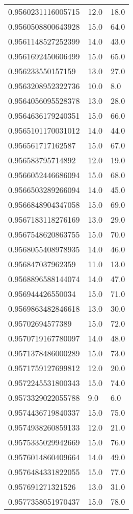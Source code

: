 \begin{center}
\begin{supertabular}[H]{p{0.30\textwidth}p{0.05\textwidth}p{0.05\textwidth}}
0.9560231116005715 & 12.0 & 18.0 \\ 
0.9560508800643928 & 15.0 & 64.0 \\ 
0.9561148527252399 & 14.0 & 43.0 \\ 
0.9561692450606499 & 15.0 & 65.0 \\ 
0.956233550157159 & 13.0 & 27.0 \\ 
0.9563208952322736 & 10.0 & 8.0 \\ 
0.9564056095528378 & 13.0 & 28.0 \\ 
0.9564636179240351 & 15.0 & 66.0 \\ 
0.9565101170031012 & 14.0 & 44.0 \\ 
0.956561717162587 & 15.0 & 67.0 \\ 
0.956583795714892 & 12.0 & 19.0 \\ 
0.9566052446686094 & 15.0 & 68.0 \\ 
0.9566503289266094 & 14.0 & 45.0 \\ 
0.9566848904347058 & 15.0 & 69.0 \\ 
0.9567183118276169 & 13.0 & 29.0 \\ 
0.9567548620863755 & 15.0 & 70.0 \\ 
0.9568055408978935 & 14.0 & 46.0 \\ 
0.956847037962359 & 11.0 & 13.0 \\ 
0.9568896588144074 & 14.0 & 47.0 \\ 
0.956944426550034 & 15.0 & 71.0 \\ 
0.9569863482846618 & 13.0 & 30.0 \\ 
0.95702694577389 & 15.0 & 72.0 \\ 
0.9570719167780097 & 14.0 & 48.0 \\ 
0.9571378486000289 & 15.0 & 73.0 \\ 
0.9571759127699812 & 12.0 & 20.0 \\ 
0.9572245531800343 & 15.0 & 74.0 \\ 
0.9573329022055788 & 9.0 & 6.0 \\ 
0.9574436719840337 & 15.0 & 75.0 \\ 
0.9574938260859133 & 12.0 & 21.0 \\ 
0.9575335029942669 & 15.0 & 76.0 \\ 
0.9576014860409664 & 14.0 & 49.0 \\ 
0.9576484331822055 & 15.0 & 77.0 \\ 
0.957691271321526 & 13.0 & 31.0 \\ 
0.9577358051970437 & 15.0 & 78.0 \\ 

\end{supertabular}
\end{center}
